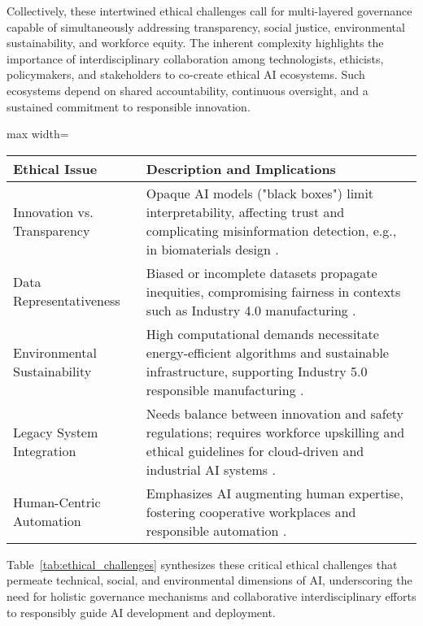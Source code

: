 \documentclass[sigconf]{acmart}
\begin{document}
Collectively, these intertwined ethical challenges call for multi-layered governance capable of simultaneously addressing transparency, social justice, environmental sustainability, and workforce equity. The inherent complexity highlights the importance of interdisciplinary collaboration among technologists, ethicists, policymakers, and stakeholders to co-create ethical AI ecosystems. Such ecosystems depend on shared accountability, continuous oversight, and a sustained commitment to responsible innovation.

\begin{table*}[htbp]
\centering
\caption{Summary of Key Cross-Cutting Ethical Challenges in AI Development and Deployment}
\label{tab:ethical_challenges}
\begin{adjustbox}{max width=\textwidth}
\begin{tabular}{ll}
\toprule
\textbf{Ethical Issue} & \textbf{Description and Implications} \\
\bottomrule
Innovation vs. Transparency & Opaque AI models ("black boxes") limit interpretability, affecting trust and complicating misinformation detection, e.g., in biomaterials design \cite{ref7,ref8}. \\
Data Representativeness & Biased or incomplete datasets propagate inequities, compromising fairness in contexts such as Industry 4.0 manufacturing \cite{ref37,ref20,ref38}. \\
Environmental Sustainability & High computational demands necessitate energy-efficient algorithms and sustainable infrastructure, supporting Industry 5.0 responsible manufacturing \cite{ref19,ref6}. \\
Legacy System Integration & Needs balance between innovation and safety regulations; requires workforce upskilling and ethical guidelines for cloud-driven and industrial AI systems \cite{ref11,ref12,ref38}. \\
Human-Centric Automation & Emphasizes AI augmenting human expertise, fostering cooperative workplaces and responsible automation \cite{ref2}. \\
\bottomrule
\end{tabular}
\end{adjustbox}
\end{table*}

Table~\ref{tab:ethical_challenges} synthesizes these critical ethical challenges that permeate technical, social, and environmental dimensions of AI, underscoring the need for holistic governance mechanisms and collaborative interdisciplinary efforts to responsibly guide AI development and deployment.
\end{document}
